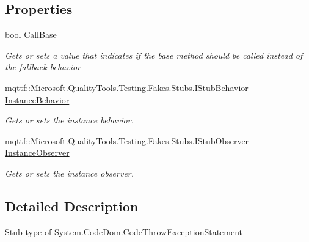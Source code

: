 \subsection*{Properties}
\begin{DoxyCompactItemize}
\item 
bool \hyperlink{class_system_1_1_code_dom_1_1_fakes_1_1_stub_code_throw_exception_statement_a5ae2b8955931985234b95dfae1396020}{Call\-Base}
\begin{DoxyCompactList}\small\item\em Gets or sets a value that indicates if the base method should be called instead of the fallback behavior\end{DoxyCompactList}\item 
mqttf\-::\-Microsoft.\-Quality\-Tools.\-Testing.\-Fakes.\-Stubs.\-I\-Stub\-Behavior \hyperlink{class_system_1_1_code_dom_1_1_fakes_1_1_stub_code_throw_exception_statement_a42d3b4f818c6d4215adb725af26df0c4}{Instance\-Behavior}
\begin{DoxyCompactList}\small\item\em Gets or sets the instance behavior.\end{DoxyCompactList}\item 
mqttf\-::\-Microsoft.\-Quality\-Tools.\-Testing.\-Fakes.\-Stubs.\-I\-Stub\-Observer \hyperlink{class_system_1_1_code_dom_1_1_fakes_1_1_stub_code_throw_exception_statement_ab1b81f135e2a5c3f2fd8adf2ca4da564}{Instance\-Observer}
\begin{DoxyCompactList}\small\item\em Gets or sets the instance observer.\end{DoxyCompactList}\end{DoxyCompactItemize}


\subsection{Detailed Description}
Stub type of System.\-Code\-Dom.\-Code\-Throw\-Exception\-Statement



